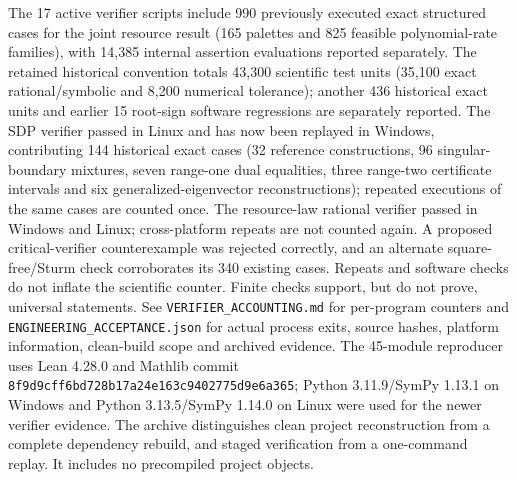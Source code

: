 \documentclass[11pt]{article}
\begin{document}
The 17 active verifier scripts include 990 previously executed exact structured cases for the joint resource result (165 palettes and 825 feasible polynomial-rate families), with 14,385 internal assertion evaluations reported separately. The retained historical convention totals 43,300 scientific test units (35,100 exact rational/symbolic and 8,200 numerical tolerance); another 436 historical exact units and earlier 15 root-sign software regressions are separately reported. The SDP verifier passed in Linux and has now been replayed in Windows, contributing 144 historical exact cases (32 reference constructions, 96 singular-boundary mixtures, seven range-one dual equalities, three range-two certificate intervals and six generalized-eigenvector reconstructions); repeated executions of the same cases are counted once. The resource-law rational verifier passed in Windows and Linux; cross-platform repeats are not counted again. A proposed critical-verifier counterexample was rejected correctly, and an alternate square-free/Sturm check corroborates its 340 existing cases. Repeats and software checks do not inflate the scientific counter. Finite checks support, but do not prove, universal statements. See \texttt{VERIFIER\_ACCOUNTING.md} for per-program counters and \texttt{ENGINEERING\_ACCEPTANCE.json} for actual process exits, source hashes, platform information, clean-build scope and archived evidence. The 45-module reproducer uses Lean 4.28.0 and Mathlib commit \nolinkurl{8f9d9cff6bd728b17a24e163c9402775d9e6a365}; Python 3.11.9/SymPy 1.13.1 on Windows and Python 3.13.5/SymPy 1.14.0 on Linux were used for the newer verifier evidence. The archive distinguishes clean project reconstruction from a complete dependency rebuild, and staged verification from a one-command replay. It includes no precompiled project objects.
\end{document}
